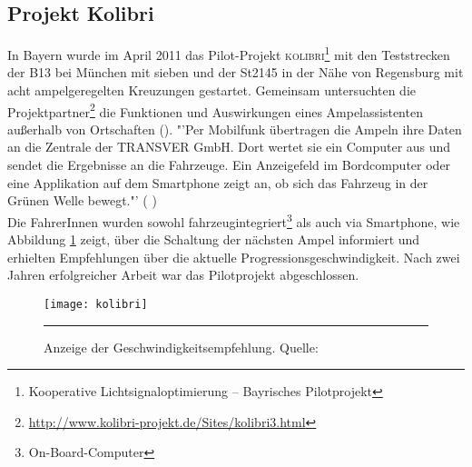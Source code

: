 \subsection*{\label{sec:kolibri}Projekt Kolibri}
In Bayern wurde im April 2011 das Pilot-Projekt \textsc{kolibri}\footnote{ Kooperative Lichtsignaloptimierung -- Bayrisches Pilotprojekt} mit den Teststrecken der B13 bei München mit sieben und der St2145 in der Nähe von Regensburg mit acht ampelgeregelten Kreuzungen gestartet. Gemeinsam untersuchten die Projektpartner\footnote{ \url{http://www.kolibri-projekt.de/Sites/kolibri3.html}} die Funktionen und Auswirkungen eines Ampelassistenten außerhalb von Ortschaften (\cite{kolibri}). "'Per Mobilfunk übertragen die Ampeln ihre Daten an die Zentrale der TRANSVER GmbH. Dort wertet sie ein Computer aus und sendet die Ergebnisse an die Fahrzeuge. Ein Anzeigefeld im Bordcomputer oder eine Applikation auf dem \gls{Smartphone} zeigt an, ob sich das Fahrzeug in der Grünen Welle bewegt."' (\cite{kolibriTUM} ) \\
Die FahrerInnen wurden sowohl fahrzeugintegriert\footnote{ On-Board-Computer} als auch via \gls{Smartphone}, wie Abbildung \ref{fig:kolibri} zeigt, über die Schaltung der nächsten Ampel informiert und erhielten Empfehlungen über die aktuelle Progressionsgeschwindigkeit. Nach zwei Jahren erfolgreicher Arbeit war das Pilotprojekt abgeschlossen.
\begin{figure}[H]  
    \centering  
    \texttt{[image: kolibri]}   
    \rule{35em}{0.5pt}   
    \caption[Projekt Kolibri]{Anzeige der Geschwindigkeitsempfehlung. Quelle: \cite{kolibri}}
    \label{fig:kolibri}
\end{figure} 
